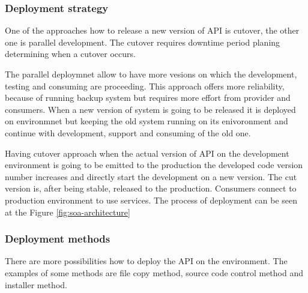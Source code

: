 \begin{figure}[htp] 
\caption{}
\label{fig:consumer-server}
\end{figure} 

\subsubsection{Deployment strategy}
One of the approaches how to release a new version of API is cutover, the other one is parallel development. The cutover requires downtime period planing determining when a cutover occurs. 

The parallel deploymnet allow to have more vesions on which the development, testing and consuming are proceeding. This approach offers more reliability, because of running backup system but requires more effort from provider and consumers. When a new version of system is going to be released it is deployed on environmnet but keeping the old system running on its enivoronment and continue with development, support and consuming of the old one. 

Having cutover approach when the actual version of API on the development environment is going to be emitted to the production the developed code version number increases and directly start the development on a new version. The cut version is, after being stable, released to the production. Consumers connect to production environment to use services. The process of deployment can be seen at the Figure \ref{fig:soa-architecture}


\subsubsection{Deployment methods}
There are more possibilities how to deploy the API on the environment. The examples of some methods are file copy method, source code control method and installer method. 

